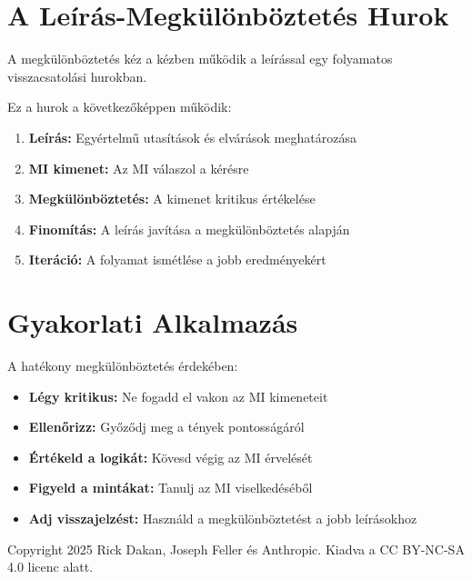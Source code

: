 \documentclass[a4paper, 11pt]{article}
\newenvironment{customquote}
  {\begin{tcolorbox}[
    left=4mm,
    right=4mm,
    top=4mm,
    bottom=4mm,
    colback=lightgray,
    colframe=accent,
    leftrule=4mm,
    rightrule=0mm,
    toprule=0mm,
    bottomrule=0mm,
    arc=2mm,
    outer arc=2mm
  ]}
  {\end{tcolorbox}}
\begin{document}
\section{A Leírás-Megkülönböztetés Hurok}

\begin{customquote}
A megkülönböztetés kéz a kézben működik a leírással egy folyamatos visszacsatolási hurokban.
\end{customquote}

Ez a hurok a következőképpen működik:

\begin{enumerate}
\item \textbf{Leírás:} Egyértelmű utasítások és elvárások meghatározása
\item \textbf{MI kimenet:} Az MI válaszol a kérésre
\item \textbf{Megkülönböztetés:} A kimenet kritikus értékelése
\item \textbf{Finomítás:} A leírás javítása a megkülönböztetés alapján
\item \textbf{Iteráció:} A folyamat ismétlése a jobb eredményekért
\end{enumerate}

\section{Gyakorlati Alkalmazás}

A hatékony megkülönböztetés érdekében:

\begin{itemize}
\item \textbf{Légy kritikus:} Ne fogadd el vakon az MI kimeneteit
\item \textbf{Ellenőrizz:} Győződj meg a tények pontosságáról
\item \textbf{Értékeld a logikát:} Kövesd végig az MI érvelését
\item \textbf{Figyeld a mintákat:} Tanulj az MI viselkedéséből
\item \textbf{Adj visszajelzést:} Használd a megkülönböztetést a jobb leírásokhoz
\end{itemize}

\vfill
\begin{center}
\small
Copyright 2025 Rick Dakan, Joseph Feller és Anthropic. Kiadva a CC BY-NC-SA 4.0 licenc alatt.
\end{center}
\end{document}
